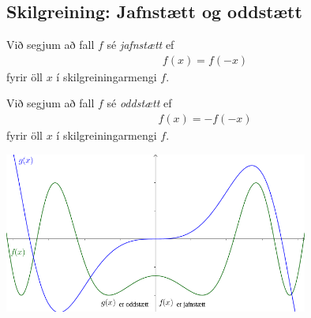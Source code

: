 \documentclass[b5paper,11pt,icelandic]{sphinxmanual}
\begin{document}

\subsection{Skilgreining: Jafnstætt og oddstætt}
\label{kafli01:skilgreining-jafnstaett-og-oddstaett}\label{kafli01:index-10}
Við segjum að fall \(f\) sé \textit{jafnstætt} ef
\begin{equation*}
\begin{split}f(x) = f(-x)\end{split}
\end{equation*}
fyrir öll \(x\) í skilgreiningarmengi \(f\).

Við segjum að fall \(f\) sé \textit{oddstætt} ef
\begin{equation*}
\begin{split}f(x) = -f(-x)\end{split}
\end{equation*}
fyrir öll \(x\) í skilgreiningarmengi \(f\).

\begin{center}
  \includegraphics[width=10cm]{04_JafnstaettOddstaett.png}
\end{center}
\end{document}

